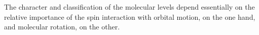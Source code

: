 The character and classification of the molecular levels depend essentially on the relative importance of the spin interaction with orbital motion, on the one hand, and molecular rotation, on the other.
